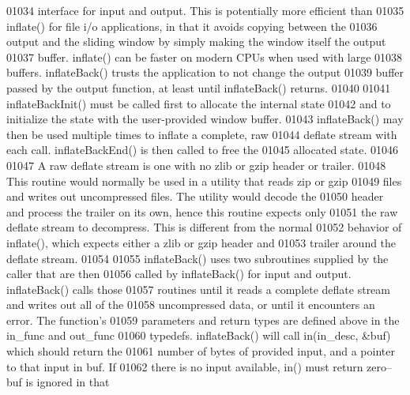 \begin{DoxyCode}
01034 \textcolor{comment}{   interface for input and output.  This is potentially more efficient than}
01035 \textcolor{comment}{   inflate() for file i/o applications, in that it avoids copying between the}
01036 \textcolor{comment}{   output and the sliding window by simply making the window itself the output}
01037 \textcolor{comment}{   buffer.  inflate() can be faster on modern CPUs when used with large}
01038 \textcolor{comment}{   buffers.  inflateBack() trusts the application to not change the output}
01039 \textcolor{comment}{   buffer passed by the output function, at least until inflateBack() returns.}
01040 \textcolor{comment}{}
01041 \textcolor{comment}{     inflateBackInit() must be called first to allocate the internal state}
01042 \textcolor{comment}{   and to initialize the state with the user-provided window buffer.}
01043 \textcolor{comment}{   inflateBack() may then be used multiple times to inflate a complete, raw}
01044 \textcolor{comment}{   deflate stream with each call.  inflateBackEnd() is then called to free the}
01045 \textcolor{comment}{   allocated state.}
01046 \textcolor{comment}{}
01047 \textcolor{comment}{     A raw deflate stream is one with no zlib or gzip header or trailer.}
01048 \textcolor{comment}{   This routine would normally be used in a utility that reads zip or gzip}
01049 \textcolor{comment}{   files and writes out uncompressed files.  The utility would decode the}
01050 \textcolor{comment}{   header and process the trailer on its own, hence this routine expects only}
01051 \textcolor{comment}{   the raw deflate stream to decompress.  This is different from the normal}
01052 \textcolor{comment}{   behavior of inflate(), which expects either a zlib or gzip header and}
01053 \textcolor{comment}{   trailer around the deflate stream.}
01054 \textcolor{comment}{}
01055 \textcolor{comment}{     inflateBack() uses two subroutines supplied by the caller that are then}
01056 \textcolor{comment}{   called by inflateBack() for input and output.  inflateBack() calls those}
01057 \textcolor{comment}{   routines until it reads a complete deflate stream and writes out all of the}
01058 \textcolor{comment}{   uncompressed data, or until it encounters an error.  The function's}
01059 \textcolor{comment}{   parameters and return types are defined above in the in\_func and out\_func}
01060 \textcolor{comment}{   typedefs.  inflateBack() will call in(in\_desc, &buf) which should return the}
01061 \textcolor{comment}{   number of bytes of provided input, and a pointer to that input in buf.  If}
01062 \textcolor{comment}{   there is no input available, in() must return zero--buf is ignored in that}

\end{DoxyCode}
